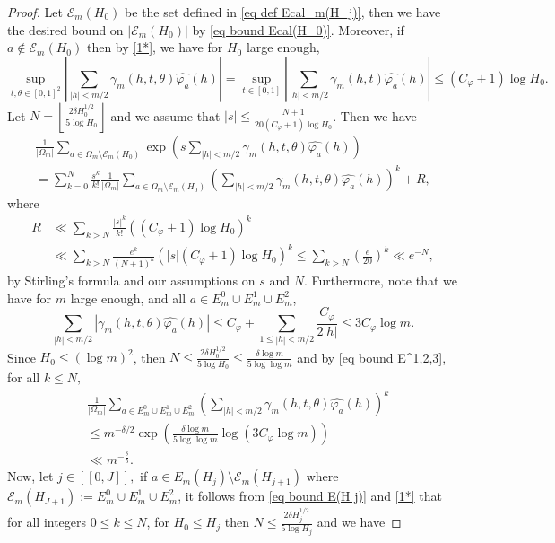 \documentclass[12pt]{amsart}
\theoremstyle{definition}
\numberwithin{equation}{section}
\numberwithin{equation}{section}
\def\Ecal{\mathcal{E}}
\def\Mp{C_\varphi}
\begin{document}
\begin{proof}
Let $\Ecal_m(H_0)$ be the set defined in \eqref{eq def Ecal_m(H_j)}, then we have the desired bound on $| \Ecal_m(H_0)| $ by \eqref{eq bound Ecal(H_0)}. Moreover, if $a \not \in \Ecal_m(H_0) $ then by \eqref{1*},
we have for $H_0$  large enough,
\[
\sup_{t,\theta\in[0,1]^2}\left|\sum_{|h|< m/2}
\gamma_m(h,t, \theta )\widehat{\varphi_a}(h)
\right| = \sup_{t\in[0,1]}
\left|
\sum_{|h|< m/2}
\gamma_m(h,t)\widehat{\varphi_a}(h)
\right|
\leq (\Mp+1)\log H_0.
\]
Let $N = \left\lfloor \frac{2\delta H_0^{1/2}}{5\log H_0}\right\rfloor$ and we assume that $|s|\leq \frac{N+1}{20(\Mp+1)\log H_0}$. Then we have
\begin{align*}\frac{1}{|\Omega_m|}
\sum_{a\in \Omega_m \setminus \Ecal_m(H_0)}
\exp
\left(
s \sum_
{|h|< m/2}
\gamma_m(h,t,\theta)\widehat{\varphi_a}(h)
\right)\\
=
\sum_{k=0}^N
\frac{s^k}{k!}
\frac{1}{|\Omega_m|}
\sum_{a\in \Omega_m \setminus \Ecal_m(H_0)}
\left(
\sum_
{|h|< m/2}
\gamma_m(h,t,\theta)\widehat{\varphi_a}(h)
\right)^k
+ R,\end{align*}
where
\begin{align*}
R &\ll \sum_{k>N} \frac{|s|^k}{k!} ((\Mp +1)\log H_0)^k \\
&\ll  \sum_{k>N}
\frac{e^k}{(N+1)^k}\left( |s|(\Mp+1) \log H_0\right)^k
\leq  \sum_{k>N}
\left(\frac{ e}{20}\right)^k
\ll e^{-N},
\end{align*}
by Stirling’s formula and our assumptions on $s$ and $N$. Furthermore, note that we have for $m$ large enough, and all $a\in E^0_m\cup E^1_m\cup E^2_m$, 
\[\sum_{|h|< m/2}
|\gamma_m(h,t,\theta)\widehat{\varphi_a}(h)| \leq  \Mp+ \sum_{1 \leq |h| < m/2}
\frac{\Mp }{2|h|}\leq 3\Mp  \log m.
\]
Since $H_0\leq (\log m)^2$, then $N\leq \frac{2\delta H_0^{1/2}}{5\log H_0} \leq \frac{\delta\log m}{5\log\log m}$ and by \eqref{eq bound E^1,2,3}, for all $k\leq N,$
\begin{align*}
&\frac{1}{|\Omega_m|}
\sum_{a\in E^0_m\cup E^1_m\cup E^2_m}\left(\sum_{|h|< m/2}
\gamma_m(h,t,\theta)\widehat{\varphi_a}(h)\right)^k\\
&\leq 
m^{-\delta/2}\exp\left( \frac{\delta\log m}{5\log\log m}\log( 3\Mp \log m)\right)\\
&\ll m^{-\frac{\delta}{5}}.
\end{align*}
Now, let $j\in [\![ 0,J ]\!] ,
$ if $ a\in E_m(H_j)\setminus \Ecal_m(H_{j+1})$ where $ \Ecal_m(H_{J+1}):= E^0_m\cup E^1_m\cup E^2_m$, it follows from \eqref{eq bound E(H j)} and \eqref{1*} that for all integers
$0 \leq  k \leq  N$, for $H_0\leq H_j$ then $N\leq \frac{2\delta H_j^{1/2}}{5\log H_j} $ and we have 

\end{proof}
\end{document}
